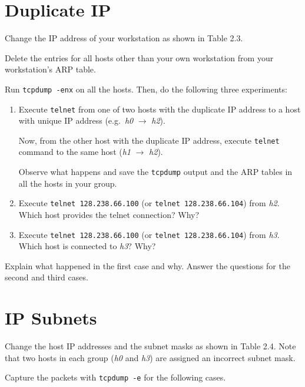 \documentclass{../UTNetLab}
\begin{document}
\section{Duplicate IP}
    Change the IP address of your workstation as shown in Table 2.3.

    Delete the entries for all hosts other than your own workstation from your workstation’s ARP table.

    Run \lstinline{tcpdump -enx} on all the hosts. Then, do the following three experiments:

    \begin{enumerate}
        \item Execute \lstinline{telnet} from one of two hosts with the duplicate IP address to a host with unique IP address (e.g.\ \textit{h0} $\rightarrow$ \textit{h2}).

        Now, from the other host with the duplicate IP address, execute \lstinline{telnet} command to the same host (\textit{h1} $\rightarrow$ \textit{h2}).

        Observe what happens and save the \lstinline{tcpdump} output and the ARP tables in all the hosts in your group.
        
        \item Execute \lstinline{telnet 128.238.66.100} (or \lstinline{telnet 128.238.66.104}) from \textit{h2}.
        Which host provides the telnet connection?
        Why?
        
        \item Execute \lstinline{telnet 128.238.66.100} (or \lstinline{telnet 128.238.66.104}) from \textit{h3}. Which host is connected to \textit{h3}? Why?
    \end{enumerate}
    
    \begin{report}
    \item Explain what happened in the first case and why.
    Answer the questions for the second and third cases.
    \end{report}

\section{IP Subnets}
    Change the host IP addresses and the subnet masks as shown in Table 2.4.
    Note that two hosts in each group (\textit{h0} and \textit{h3}) are assigned an incorrect subnet mask.

    Capture the packets with \lstinline{tcpdump -e} for the following cases.
\end{document}
